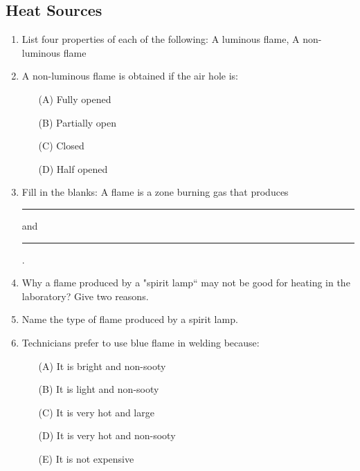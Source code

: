 \subsection{Heat Sources}

\begin{enumerate}
	\item List four properties of each of the following: A luminous flame, A non-luminous flame
	
	\item A non-luminous flame is obtained if the air hole is:
	\begin{enumerate}[topsep=0ex,itemsep=0ex,partopsep=1ex,parsep=1ex]
		\item[(A)] Fully opened
		\item[(B)] Partially open
		\item[(C)] Closed
		\item[(D)] Half opened
	\end{enumerate}
	
	\item Fill in the blanks: A flame is a zone burning gas that produces \rule{1.5cm}{0.15mm} and \rule{1.5cm}{0.15mm}.

	\item Why a flame produced by a "spirit lamp`` may not be good for heating in the laboratory? Give two reasons.
	
	\item Name the type of flame produced by a spirit lamp.
	\item Technicians prefer to use blue flame in welding because:
	\begin{enumerate}[topsep=0ex,itemsep=0ex,partopsep=1ex,parsep=1ex]
		\item[(A)] It is bright and non-sooty
		\item[(B)] It is light and non-sooty
		\item[(C)] It is very hot and large
		\item[(D)] It is very hot and non-sooty
		\item[(E)] It is not expensive
	\end{enumerate}
\end{enumerate}